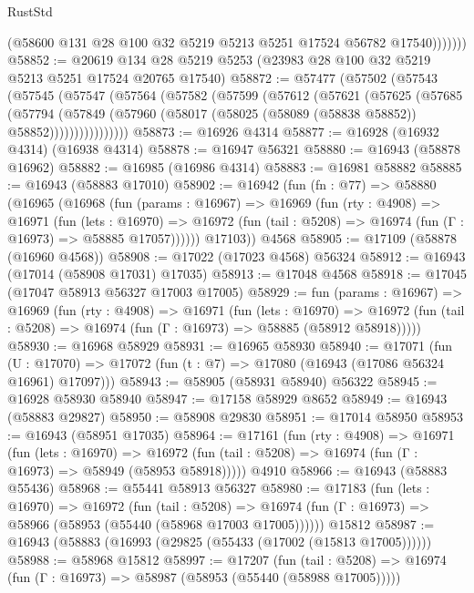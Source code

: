 \begin{lexlean}{RustStd}
\begin{coremodule}
                (@58600 @131 @28 @100 @32 @5219 @5213 @5251 @17524 @56782 @17540)))))))
@58852 := @20619 @134 @28 @5219 @5253 (@23983 @28 @100 @32 @5219 @5213 @5251 @17524 @20765 @17540)
@58872 := @57477
    (@57502
      (@57543
        (@57545
          (@57547
            (@57564
              (@57582
                (@57599
                  (@57612
                    (@57621
                      (@57625
                        (@57685
                          (@57794
                            (@57849
                              (@57960
                                (@58017 (@58025 (@58089 (@58838 @58852)) @58852))))))))))))))))
@58873 := @16926 @4314
@58877 := @16928 (@16932 @4314) (@16938 @4314)
@58878 := @16947 @56321
@58880 := @16943 (@58878 @16962)
@58882 := @16985 (@16986 @4314)
@58883 := @16981 @58882
@58885 := @16943 (@58883 @17010)
@58902 := @16942
    (fun (fn : @77) =>
    @58880
      (@16965
        (@16968
          (fun (params : @16967) =>
          @16969
            (fun (rty : @4908) =>
            @16971
              (fun (lets : @16970) =>
              @16972 (fun (tail : @5208) => @16974 (fun (Γ : @16973) => @58885 @17057))))))
        @17103))
    @4568
@58905 := @17109 (@58878 (@16960 @4568))
@58908 := @17022 (@17023 @4568) @56324
@58912 := @16943 (@17014 (@58908 @17031) @17035)
@58913 := @17048 @4568
@58918 := @17045 (@17047 @58913 @56327 @17003 @17005)
@58929 := fun (params : @16967) =>
  @16969
    (fun (rty : @4908) =>
    @16971
      (fun (lets : @16970) =>
      @16972 (fun (tail : @5208) => @16974 (fun (Γ : @16973) => @58885 (@58912 @58918)))))
@58930 := @16968 @58929
@58931 := @16965 @58930
@58940 := @17071
    (fun (U : @17070) => @17072 (fun (t : @7) => @17080 (@16943 (@17086 @56324 @16961) @17097)))
@58943 := @58905 (@58931 @58940) @56322
@58945 := @16928 @58930 @58940
@58947 := @17158 @58929 @8652
@58949 := @16943 (@58883 @29827)
@58950 := @58908 @29830
@58951 := @17014 @58950
@58953 := @16943 (@58951 @17035)
@58964 := @17161
    (fun (rty : @4908) =>
    @16971
      (fun (lets : @16970) =>
      @16972 (fun (tail : @5208) => @16974 (fun (Γ : @16973) => @58949 (@58953 @58918)))))
    @4910
@58966 := @16943 (@58883 @55436)
@58968 := @55441 @58913 @56327
@58980 := @17183
    (fun (lets : @16970) =>
    @16972
      (fun (tail : @5208) =>
      @16974 (fun (Γ : @16973) => @58966 (@58953 (@55440 (@58968 @17003 @17005))))))
    @15812
@58987 := @16943 (@58883 (@16993 (@29825 (@55433 (@17002 (@15813 @17005))))))
@58988 := @58968 @15812
@58997 := @17207
    (fun (tail : @5208) => @16974 (fun (Γ : @16973) => @58987 (@58953 (@55440 (@58988 @17005)))))

\end{coremodule}
\end{lexlean}
